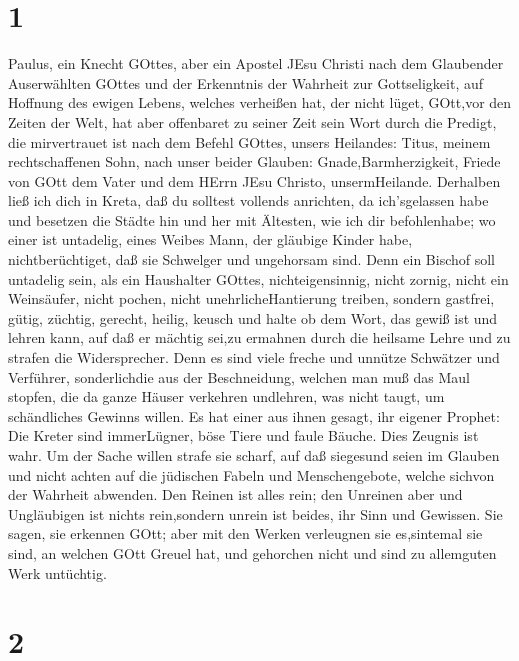 \hypertarget{section}{%
\section{1}\label{section}}

 Paulus, ein Knecht GOttes, aber ein Apostel JEsu Christi
nach dem Glaubender Auserwählten GOttes und der Erkenntnis der Wahrheit
zur Gottseligkeit,  auf Hoffnung des ewigen Lebens, welches
verheißen hat, der nicht lüget, GOtt,vor den Zeiten der Welt,
 hat aber offenbaret zu seiner Zeit sein Wort durch die
Predigt, die mirvertrauet ist nach dem Befehl GOttes, unsers Heilandes:
 Titus, meinem rechtschaffenen Sohn, nach unser beider
Glauben: Gnade,Barmherzigkeit, Friede von GOtt dem Vater und dem HErrn
JEsu Christo, unsermHeilande.  Derhalben ließ ich dich in
Kreta, daß du solltest vollends anrichten, da ich'sgelassen habe und
besetzen die Städte hin und her mit Ältesten, wie ich dir befohlenhabe;
 wo einer ist untadelig, eines Weibes Mann, der gläubige
Kinder habe, nichtberüchtiget, daß sie Schwelger und ungehorsam sind.
 Denn ein Bischof soll untadelig sein, als ein Haushalter
GOttes, nichteigensinnig, nicht zornig, nicht ein Weinsäufer, nicht
pochen, nicht unehrlicheHantierung treiben,  sondern
gastfrei, gütig, züchtig, gerecht, heilig, keusch  und halte
ob dem Wort, das gewiß ist und lehren kann, auf daß er mächtig sei,zu
ermahnen durch die heilsame Lehre und zu strafen die Widersprecher.
 Denn es sind viele freche und unnütze Schwätzer und
Verführer, sonderlichdie aus der Beschneidung,  welchen man
muß das Maul stopfen, die da ganze Häuser verkehren undlehren, was nicht
taugt, um schändliches Gewinns willen.  Es hat einer aus
ihnen gesagt, ihr eigener Prophet: Die Kreter sind immerLügner, böse
Tiere und faule Bäuche.  Dies Zeugnis ist wahr. Um der
Sache willen strafe sie scharf, auf daß siegesund seien im Glauben
 und nicht achten auf die jüdischen Fabeln und
Menschengebote, welche sichvon der Wahrheit abwenden.  Den
Reinen ist alles rein; den Unreinen aber und Ungläubigen ist nichts
rein,sondern unrein ist beides, ihr Sinn und Gewissen.  Sie
sagen, sie erkennen GOtt; aber mit den Werken verleugnen sie es,sintemal
sie sind, an welchen GOtt Greuel hat, und gehorchen nicht und sind zu
allemguten Werk untüchtig.

\hypertarget{section-1}{%
\section{2}\label{section-1}}


